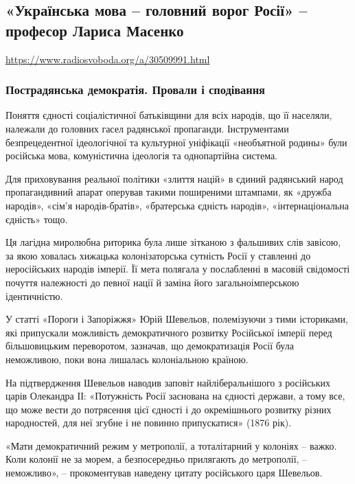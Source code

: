  
 

\subsection{«Українська мова – головний ворог Росії» – професор Лариса Масенко}

\url{https://www.radiosvoboda.org/a/30509991.html}

\subsubsection{Пострадянська демократія. Провали і сподівання}

Поняття єдності соціалістичної батьківщини для всіх народів, що її населяли,
належали до головних гасел радянської пропаганди. Інструментами безпрецедентної
ідеологічної та культурної уніфікації «необъятной родины» були російська мова,
комуністична ідеологія та однопартійна система.

Для приховування реальної політики «злиття націй» в єдиний радянський народ
пропагандивний апарат оперував такими поширеними штампами, як «дружба народів»,
«сім’я народів-братів», «братерська єдність народів», «інтернаціональна
єдність» тощо.

Ця лагідна миролюбна риторика була лише зітканою з фальшивих слів завісою, за
якою ховалась хижацька колонізаторська сутність Росії у ставленні до
неросійських народів імперії. Її мета полягала у послабленні в масовій
свідомості почуття належності до певної нації й заміна його загальноімперською
ідентичністю.

У статті «Пороги і Запоріжжя» Юрій Шевельов, полемізуючи з тими істориками, які
припускали можливість демократичного розвитку Російської імперії перед
більшовицьким переворотом, зазначав, що демократизація Росії була неможливою,
поки вона лишалась колоніальною країною.

На підтвердження Шевельов наводив заповіт найліберальнішого з російських царів
Олекандра ІІ: «Потужність Росії заснована на єдності держави, а тому все, що
може вести до потрясення цієї єдності і до окремішнього розвитку різних
народностей, для неї згубне і не повинно припускатися» (1876 рік).

«Мати демократичний режим у метрополії, а тоталітарний у колоніях – важко. Коли
колонії не за морем, а безпосередньо прилягають до метрополії, – неможливо», –
прокоментував наведену цитату російського царя Шевельов.


